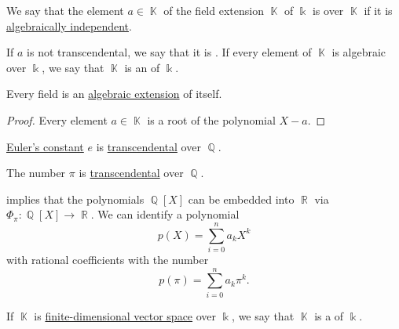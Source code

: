 \begin{definition}\label{def:transcendetal_element}
  We say that the element \( a \in \BbbK \) of the field extension \( \BbbK \) of \( \Bbbk \) is  over \( \BbbK \) if it is \hyperref[def:algebraic_dependence]{algebraically independent}.

  If \( a \) is not transcendental, we say that it is . If every element of \( \BbbK \) is algebraic over \( \Bbbk \), we say that \( \BbbK \) is an  of \( \Bbbk \).
\end{definition}

\begin{proposition}\label{thm:field_is_algebraic_over_itself}
  Every field is an \hyperref[def:transcendental_element]{algebraic extension} of itself.
\end{proposition}
\begin{proof}
  Every element \( a \in \BbbK \) is a root of the polynomial \( X - a \).
\end{proof}

\begin{theorem}\label{thm:eulers_constant_is_transcendental}
  \hyperref[def:exponential_function]{Euler's constant} \( e \) is \hyperref[def:transcendetal_element]{transcendental} over \( \BbbQ \).
\end{theorem}

\begin{theorem}[Pi is transcendental]\label{thm:pi_is_transcendental}
  The number \hyperref[def:pi]{\( \pi \)} is \hyperref[def:transcendetal_element]{transcendental} over \( \BbbQ \).
\end{theorem}

\begin{example}\label{ex:polynomials_over_pi}
   implies that the polynomials \( \BbbQ[X] \) can be embedded into \( \BbbR \) via \( \Phi_\pi: \BbbQ[X] \to \BbbR \). We can identify a polynomial
  \begin{equation*}
    p(X) = \sum_{i=0}^n a_k X^k
  \end{equation*}
  with rational coefficients with the number
  \begin{equation*}
    p(\pi) = \sum_{i=0}^n a_k \pi^k.
  \end{equation*}
\end{example}

\begin{definition}\label{def:finite_field_extension}
  If \( \BbbK \) is \hyperref[thm:vector_space_dimension]{finite-dimensional vector space} over \( \Bbbk \), we say that \( \BbbK \) is a  of \( \Bbbk \).
\end{definition}

